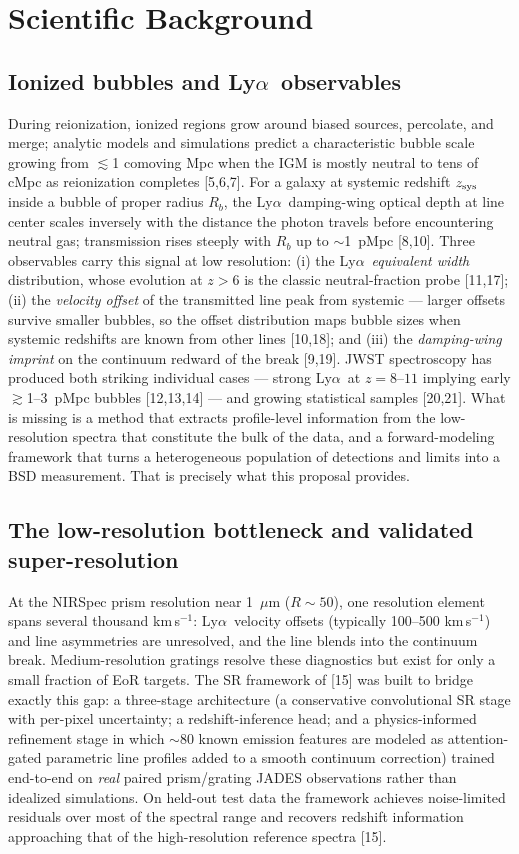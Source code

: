 \documentclass[12pt,letterpaper]{article}
\newcommand{\lya}{Ly$\alpha$}
\begin{document}
\section{Scientific Background}
\label{sec:background}

\subsection{Ionized bubbles and \lya\ observables}
During reionization, ionized regions grow around biased sources,
percolate, and merge; analytic models and simulations predict a
characteristic bubble scale growing from $\lesssim$1 comoving Mpc when
the IGM is mostly neutral to tens of cMpc as reionization completes
[5,6,7]. For a galaxy at systemic redshift $z_{\rm sys}$ inside a bubble
of proper radius $R_b$, the \lya\ damping-wing optical depth at line
center scales inversely with the distance the photon travels before
encountering neutral gas; transmission rises steeply with $R_b$ up to
$\sim$1~pMpc [8,10]. Three observables carry this signal at low
resolution: (i) the \lya\ \emph{equivalent width} distribution, whose
evolution at $z>6$ is the classic neutral-fraction probe [11,17]; (ii)
the \emph{velocity offset} of the transmitted line peak from systemic ---
larger offsets survive smaller bubbles, so the offset distribution maps
bubble sizes when systemic redshifts are known from other lines
[10,18]; and (iii) the \emph{damping-wing imprint} on the continuum
redward of the break [9,19]. JWST spectroscopy has produced both striking
individual cases --- strong \lya\ at $z=8$--$11$ implying early
$\gtrsim$1--3~pMpc bubbles [12,13,14] --- and growing statistical samples
[20,21]. What is missing is a method that extracts profile-level
information from the low-resolution spectra that constitute the bulk of
the data, and a forward-modeling framework that turns a heterogeneous
population of detections and limits into a BSD measurement. That is
precisely what this proposal provides.

\subsection{The low-resolution bottleneck and validated super-resolution}
At the NIRSpec prism resolution near 1~$\mu$m ($R\sim50$), one resolution
element spans several thousand km\,s$^{-1}$: \lya\ velocity offsets
(typically 100--500 km\,s$^{-1}$) and line asymmetries are unresolved,
and the line blends into the continuum break. Medium-resolution gratings
resolve these diagnostics but exist for only a small fraction of EoR
targets. The SR framework of [15] was built to bridge exactly this gap:
a three-stage architecture (a conservative convolutional SR stage with
per-pixel uncertainty; a redshift-inference head; and a physics-informed
refinement stage in which $\sim$80 known emission features are modeled as
attention-gated parametric line profiles added to a smooth continuum
correction) trained end-to-end on \emph{real} paired prism/grating
JADES observations rather than idealized simulations. On held-out test
data the framework achieves noise-limited residuals over most of the
spectral range and recovers redshift information approaching that of the
high-resolution reference spectra [15].
\end{document}
